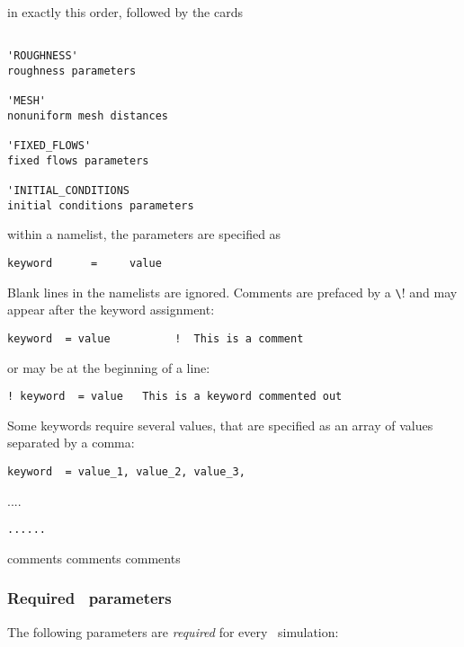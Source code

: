 in exactly this order, followed by the cards

\begin{verbatim}

'ROUGHNESS'
roughness parameters

'MESH'
nonuniform mesh distances

'FIXED_FLOWS'
fixed flows parameters

'INITIAL_CONDITIONS
initial conditions parameters

\end{verbatim}

within a namelist, the parameters are specified as
\begin{verbatim}
keyword      =     value
\end{verbatim}
Blank lines in the namelists are ignored.  Comments are prefaced by
a \verb!\!! and may appear after the keyword assignment:
\begin{verbatim}
keyword  = value          !  This is a comment
\end{verbatim}
or may be at the beginning of a line:
\begin{verbatim}
! keyword  = value   This is a keyword commented out
\end{verbatim}
Some keywords require several values, that are specified as an array of values
separated by a comma:
\begin{verbatim}
keyword  = value_1, value_2, value_3, 
\end{verbatim}
....
\begin{verbatim}
......
\end{verbatim}

comments comments comments


\subsubsection{Required \PDAC\  parameters}
\label{section:requiredparams}

The following parameters are {\em required} for every
\PDAC\ simulation:

